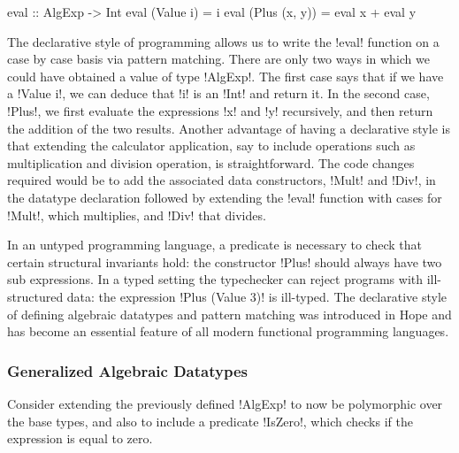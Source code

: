 \documentclass[manuscript,screen,nonacm]{acmart}
\begin{document}
\begin{CenteredBox}
\begin{code}
eval :: AlgExp -> Int
eval (Value i) = i
eval (Plus (x, y)) = eval x + eval y
\end{code}
\end{CenteredBox}

The declarative style of programming allows us to write the !eval! function on a case by case basis via pattern matching. There are only two ways in which we could have obtained a value of type !AlgExp!. The first case says that if we have a !Value i!, we can deduce that !i! is an !Int! and return it. In the second case, !Plus!, we first evaluate the expressions !x! and !y! recursively, and then return the addition of the two results. Another advantage of having a declarative style is that extending the calculator application, say to include operations such as multiplication and division operation, is straightforward. The code changes required would be to add the associated data constructors, !Mult! and !Div!, in the datatype declaration followed by extending the !eval! function with cases for !Mult!, which multiplies, and !Div! that divides.

In an untyped programming language, a predicate is necessary to check that certain structural invariants hold: the constructor !Plus! should always have two sub expressions. In a typed setting the typechecker can reject programs with ill-structured data: the expression !Plus (Value 3)! is ill-typed. The declarative style of defining algebraic datatypes and pattern matching was introduced in Hope\cite{burstall_proving_1969, burstall_hope_1980} and has become an essential feature of all modern functional programming languages.

\subsubsection{Generalized Algebraic Datatypes}
Consider extending the previously defined !AlgExp! to now be polymorphic over the base types, and also to include a predicate !IsZero!, which checks if the expression is equal to zero.
\end{document}
